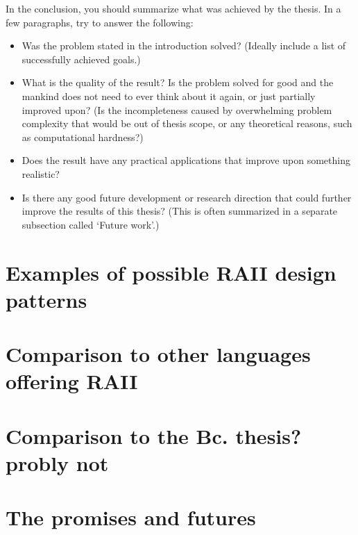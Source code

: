


In the conclusion, you should summarize what was achieved by the thesis. In a few paragraphs, try to answer the following:
\begin{itemize}
\item Was the problem stated in the introduction solved? (Ideally include a list of successfully achieved goals.)
\item What is the quality of the result? Is the problem solved for good and the mankind does not need to ever think about it again, or just partially improved upon? (Is the incompleteness caused by overwhelming problem complexity that would be out of thesis scope, or any theoretical reasons, such as computational hardness?)
\item Does the result have any practical applications that improve upon something realistic?
\item Is there any good future development or research direction that could further improve the results of this thesis? (This is often summarized in a separate subsection called `Future work'.)
\end{itemize}

\section{Examples of possible RAII design patterns}

\section{Comparison to other languages offering RAII}

\section{Comparison to the Bc. thesis? probly not}

\section{The promises and futures}
